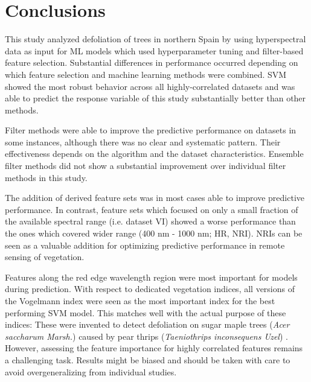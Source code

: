 \documentclass[remotesensing,article,submit,moreauthors,pdftex]{Definitions/mdpi}
\begin{document}
\section{Conclusions}

This study analyzed defoliation of trees in northern Spain by using hyperspectral data as input for ML models which used hyperparameter tuning and filter-based feature selection.
Substantial differences in performance occurred depending on which feature selection and machine learning methods were combined.
SVM showed the most robust behavior across all highly-correlated datasets and was able to predict the response variable of this study substantially better than other methods.

Filter methods were able to improve the predictive performance on datasets in some instances, although there was no clear and systematic pattern.
Their effectiveness depends on the algorithm and the dataset characteristics.
Ensemble filter methods did not show a substantial improvement over individual filter methods in this study.

The addition of derived feature sets was in most cases able to improve predictive performance.
In contrast, feature sets which focused on only a small fraction of the available spectral range (i.e. dataset VI) showed a worse performance than the ones which covered wider range (400 nm - 1000 nm; HR, NRI).
NRIs can be seen as a valuable addition for optimizing predictive performance in remote sensing of vegetation.

Features along the red edge wavelength region were most important for models during prediction.
With respect to dedicated vegetation indices, all versions of the Vogelmann index were seen as the most important index for the best performing SVM model.
This matches well with the actual purpose of these indices:
These were invented to detect defoliation on sugar maple trees (\textit{Acer saccharum Marsh.}) caused by pear thrips (\textit{Taeniothrips inconsequens Uzel}) \cite{vogelmann1993}.
However, assessing the feature importance for highly correlated features remains a challenging task.
Results might be biased and should be taken with care to avoid overgeneralizing from individual studies.
\end{document}

